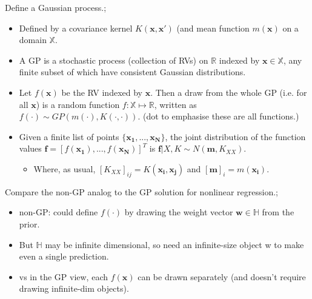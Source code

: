 \documentclass{article}
\begin{document}
Define a Gaussian process.; \begin{itemize}
    \item Defined by a covariance kernel $K(\mathbf{x, x'})$ (and mean function $m(\mathbf{x})$ on a domain $\mathbb{X}$.
    \item A GP is a stochastic process (collection of RVs) on $\mathbb{R}$ indexed by $\mathbf{x}\in \mathbb{X}$, any finite subset of which have consistent Gaussian distributions.
    \item Let $f(\mathbf{x})$ be the RV indexed by $\mathbf{x}$. Then a draw from the whole GP (i.e. for all $\mathbf{x}$) is a random function $f:\mathbb{X}\mapsto\mathbb{R}$, written as $f(\cdot)\sim GP(m(\cdot), K(\cdot, \cdot))$. (dot to emphasise these are all functions.)
    \item Given a finite list of points $\{\mathbf{x_1,...,x_N}\}$, the joint distribution of the function values $\mathbf{f}=[f(\mathbf{x_1}),...,f(\mathbf{x_N})]^T$ is $\mathbf{f}|X, K\sim N(\mathbf{m}, K_{XX})$.
    \begin{itemize}
        \item Where, as usual, $[K_{XX}]_{ij}=K(\mathbf{x_i, x_j})$ and $[\mathbf{m}]_i=m(\mathbf{x_i})$.
    \end{itemize}
\end{itemize}

Compare the non-GP analog to the GP solution for nonlinear regression.; \begin{itemize}
    \item non-GP: could define $f(\cdot)$ by drawing the weight vector $\mathbf{w}\in \mathbb{H}$ from the prior.
    \item But $\mathbb{H}$ may be infinite dimensional, so need an infinite-size object w to make even a single prediction.
    \item vs in the GP view, each $f(\mathbf{x})$ can be drawn separately (and doesn't require drawing infinite-dim objects).
\end{itemize}
\end{document}
